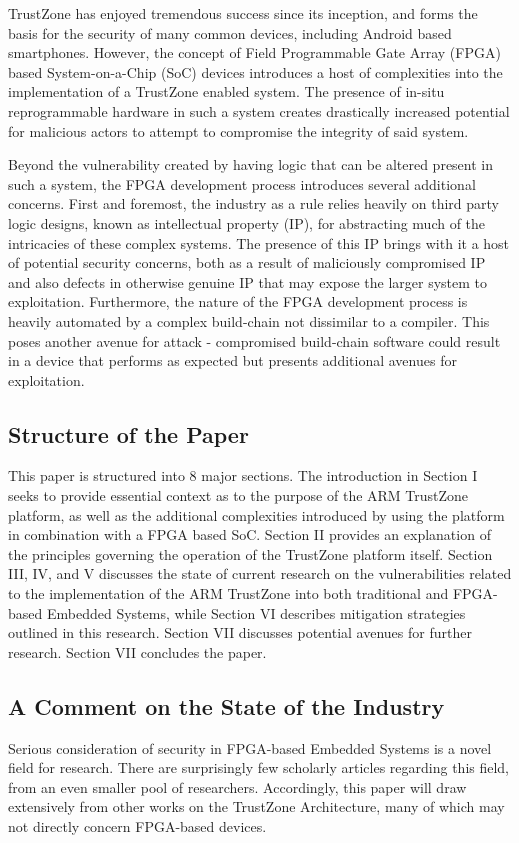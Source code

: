 \documentclass[journal]{IEEEtran}
\begin{document}
TrustZone has enjoyed tremendous success since its inception, and forms the basis for the
security of many common devices, including Android based smartphones. However, the concept
of Field Programmable Gate Array (FPGA) based System-on-a-Chip (SoC) devices introduces a
host of complexities into the implementation of a TrustZone enabled system. The
presence of in-situ reprogrammable hardware in such a system creates drastically increased
potential for malicious actors to attempt to compromise the integrity of said system.

Beyond the vulnerability created by having logic that can be altered present in such a
system, the FPGA development process introduces several additional concerns. First and
foremost, the industry as a rule relies heavily on third party logic designs, known as 
intellectual property (IP), for abstracting much of the intricacies of these complex 
systems. The presence of this IP brings with it a host of potential security concerns,
both as a result of maliciously compromised IP and also defects in otherwise genuine IP 
that may expose the larger system to exploitation. Furthermore, the nature of the FPGA
development process is heavily automated by a complex build-chain not dissimilar to a
compiler. This poses another avenue for attack - compromised build-chain software could
result in a device that performs as expected but presents additional avenues for
exploitation.

\subsection{Structure of the Paper} \label{sec:Structure}
This paper is structured into 8 major sections. The introduction in Section I seeks to
provide essential context as to the purpose of the ARM TrustZone platform, as well as the 
additional complexities introduced by using the platform in combination with a FPGA based 
SoC. Section II provides an explanation of the principles governing the operation of the 
TrustZone platform itself. Section III, IV, and V discusses the state of current research 
on the vulnerabilities related to the implementation of the ARM TrustZone into both 
traditional and FPGA-based Embedded Systems, while Section VI describes mitigation
strategies outlined in this research. Section VII discusses potential avenues for further 
research. Section VII concludes the paper.

\subsection{A Comment on the State of the Industry} \label{sec:SOI Comment}
Serious consideration of security in FPGA-based Embedded Systems is a novel field for
research. There are surprisingly few scholarly articles regarding this field, from an even
smaller pool of researchers. Accordingly, this paper will draw extensively from other 
works on the TrustZone Architecture, many of which may not directly concern FPGA-based 
devices.
\end{document}
